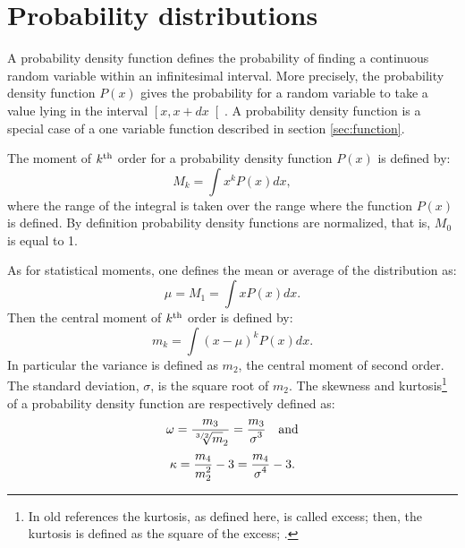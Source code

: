 \documentclass[twoside]{book}
\begin{document}
\section{Probability distributions}
\label{sec:probdistr}A probability density function defines the
probability of finding a continuous random variable within an
infinitesimal interval. More precisely, the probability density
function $P\left(x\right)$ gives the probability for a random
variable to take a value lying in the interval
$\left[x,x+dx\right[$. A probability density function is a special
case of a one variable function described in section
\ref{sec:function}.

The moment of $k^{\mathop{\rm th}}$ order for a probability
density function $P\left(x\right)$ is defined by:
\begin{equation}
\label{eq:probdensity}
  M_k=\int x^k P\left(x\right) dx,
\end{equation}
where the range of the integral is taken over the range where the
function $P\left(x\right)$ is defined. By definition probability
density functions are normalized, that is, $M_0$ is equal to 1.

As for statistical moments, one defines the mean or average of the
distribution as:
\begin{equation}
  \mu=M_1=\int x P\left(x\right) dx.
\end{equation}
Then the central moment of $k^{\mathop{\rm th}}$ order is defined
by:
\begin{equation}
  m_k=\int \left(x-\mu\right)^k P\left(x\right) dx.
\end{equation}
In particular the variance is defined as $m_2$, the central moment
of second order. The standard deviation, $\sigma$, is the square
root of $m_2$. The skewness and kurtosis\footnote{In old
references the kurtosis, as defined here, is called excess; then,
the kurtosis is defined as the square of the excess;
\cite{AbrSteg} \eg.} of a probability density function are
respectively defined as:
\begin{equation}
  \omega={\displaystyle m_3 \over\displaystyle {\root 3/2 \of m_2}}
  ={\displaystyle m_3 \over\displaystyle \sigma^3}\mbox{\quad and}
\end{equation}
\begin{equation}
  \kappa={\displaystyle m_4 \over\displaystyle m_2^2}-3
  ={\displaystyle m_4 \over\displaystyle \sigma^4}-3.
\end{equation}
\end{document}
